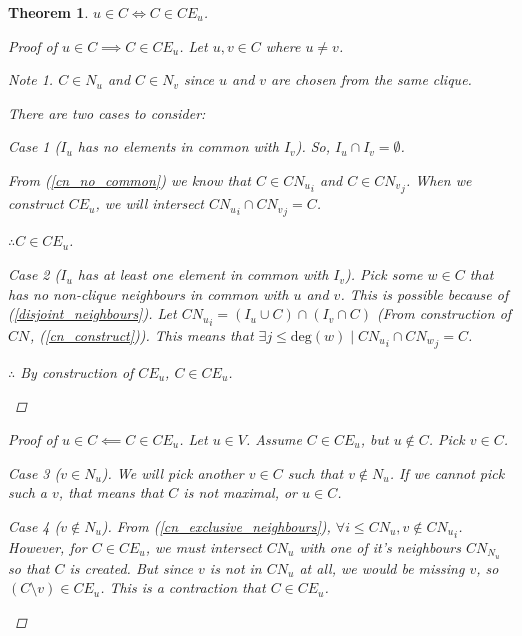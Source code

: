 \documentclass{article}
\theoremstyle{plain}
\newtheorem{thm}{Theorem}[section]
\theoremstyle{definition}
\theoremstyle{remark}
\newtheorem*{note}{Note}
\newtheorem*{case}{Case}
\newcommand{\cn}[1]{ {{CN}_{#1}} }
\newcommand{\ce}[1]{ {{CE}_{#1}} }
\newcommand{\vdeg}[1]{ {\text{deg}({#1})} }
\newcommand{\ignv}[1]{ {I_{#1}} }
\newcommand{\nev}[1]{ {N_{#1}} }
\begin{document}
\begin{thm}
    \(u \in C \iff C \in \ce{u}\).

    \begin{proof}[Proof of \(u \in C \implies C \in \ce{u}\)]
        Let \(u, v \in C\) where \(u \neq v\).
        \begin{note}
            \(C \in \nev{u}\) and \(C \in \nev{v}\) since \(u\) and \(v\) are chosen from
            the same clique.
        \end{note}
        There are two cases to consider:
        \begin{case}[\(\ignv{u}\) has no elements in common with \(\ignv{v}\)]
            So, \(\ignv{u} \cap \ignv{v} = \emptyset\).

            From (\ref{cn_no_common})
            we know that \(C \in \cn{u}_i\) and \(C \in \cn{v}_j\). When we construct
            \(\ce{u}\), we will intersect \(\cn{u}_i \cap \cn{v}_j = C\).

            \(\therefore C \in \ce{u}\).
        \end{case}
        \begin{case}[\(\ignv{u}\) has at least one element in common with \(\ignv{v}\)]
            Pick some \(w \in C\) that has no non-clique neighbours in common with \(u\)
            and \(v\). This is possible because of (\ref{disjoint_neighbours}). Let
            \(\cn{u}_i = (\ignv{u} \cup C) \cap (\ignv{v} \cap C)\) (From construction of
            \(\cn{}\), (\ref{cn_construct})). This means that
            \(\exists j \leq \vdeg{w} \mid \cn{u}_i \cap \cn{w}_j = C\).

            \(\therefore\) By construction of \(\ce{u}\), \(C \in \ce{u}\).
        \end{case}
    \end{proof}

    \begin{proof}[Proof of \(u \in C \impliedby C \in \ce{u}\)]
        Let \(u \in V\). Assume \(C \in \ce{u}\), but \(u \not\in C\). Pick \(v \in C\).

        \begin{case}[\(v \in \nev{u}\)]
            We will pick another \(v \in C\) such that \(v \not\in \nev{u}\). If we cannot
            pick such a \(v\), that means that \(C\) is not maximal, or \(u \in C\).
        \end{case}
        \begin{case}[\(v \not\in \nev{u}\)]
            From (\ref{cn_exclusive_neighbours}),
            \(\forall i \leq \cn{u}, v \not\in \cn{u}_i\). However, for \(C \in \ce{u}\),
            we must intersect \(\cn{u}\) with one of it's neighbours \(\cn{\nev{u}}\) so
            that \(C\) is created. But since \(v\) is not in \(\cn{u}\) at all, we would
            be missing \(v\), so \((C \setminus v) \in \ce{u}\). This is a contraction
            that \(C \in \ce{u}\).


\end{case}
\end{proof}
\end{thm}
\end{document}
